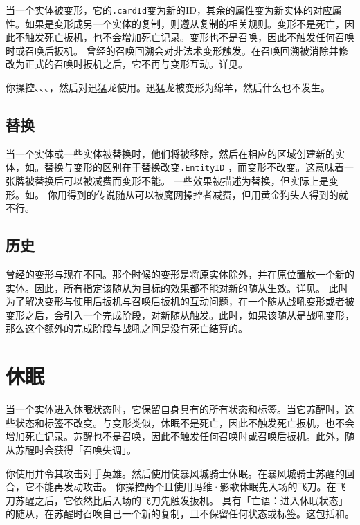 当一个实体被变形，它的\texttt{.cardId}变为新的ID，其余的属性变为新实体的对应属性。如果是变形成另一个实体的复制，则遵从复制的相关规则。变形不是死亡，因此不触发死亡扳机，也不会增加死亡记录。变形也不是召唤，因此不触发任何召唤时或召唤后扳机。
\notice {}曾经的召唤回溯会对非法术变形触发。在召唤回溯被消除并修改为正式的召唤时扳机之后，它不再与变形互动。详见。

\example 你操控、、、，然后对迅猛龙使用。迅猛龙被变形为绵羊，然后什么也不发生。

\subsection{替换}

当一个实体或一些实体被替换时，他们将被移除，然后在相应的区域创建新的实体，如。替换与变形的区别在于替换改变\texttt{.EntityID} ，而变形不改变。这意味着一张牌被替换后可以被减费而变形不能。
\notice 一些效果被描述为替换，但实际上是变形。如。
\example 你用得到的传说随从可以被魔网操控者减费，但用黄金狗头人得到的就不行。

\subsection{历史}

曾经的变形与现在不同。那个时候的变形是将原实体除外，并在原位置放一个新的实体。因此，所有指定该随从为目标的效果都不能对新的随从生效。详见。
\notice 此时为了解决变形与使用后扳机与召唤后扳机的互动问题，在一个随从战吼变形或者被变形之后，会引入一个完成阶段，对新随从触发。此时，如果该随从是战吼变形，那么这个额外的完成阶段与战吼之间是没有死亡结算的。

\section{休眠}
当一个实体进入休眠状态时，它保留自身具有的所有状态和标签。当它苏醒时，这些状态和标签不改变。与变形类似，休眠不是死亡，因此不触发死亡扳机，也不会增加死亡记录。苏醒也不是召唤，因此不触发任何召唤时或召唤后扳机。此外，随从苏醒时会获得「召唤失调」。

\example 你使用并令其攻击对手英雄。然后使用使暴风城骑士休眠。在暴风城骑士苏醒的回合，它不能再发动攻击。
\example 你操控两个且使用玛维·影歌休眠先入场的飞刀。在飞刀苏醒之后，它依然比后入场的飞刀先触发扳机。
\exception 具有「亡语：进入休眠状态」的随从，在苏醒时召唤自己一个新的复制，且不保留任何状态或标签。这包括和。

